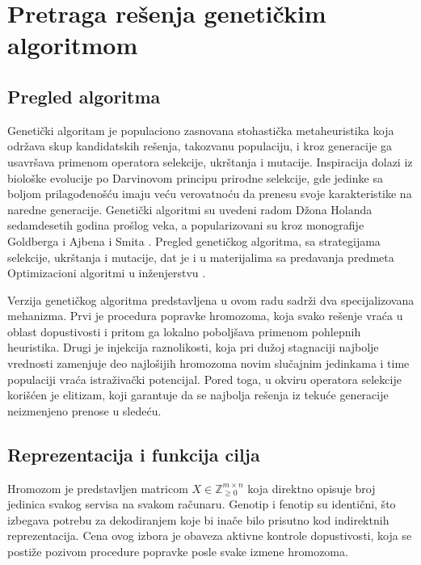 \documentclass[12pt]{article}
\begin{document}
\pagebreak

\section{Pretraga rešenja genetičkim algoritmom}\label{sec:ga}

\subsection{Pregled algoritma}

Genetički algoritam je populaciono zasnovana stohastička metaheuristika koja održava skup kandidatskih rešenja, takozvanu populaciju, i kroz generacije ga usavršava primenom operatora selekcije, ukrštanja i mutacije. Inspiracija dolazi iz biološke evolucije po Darvinovom principu prirodne selekcije, gde jedinke sa boljom prilagođenošću imaju veću verovatnoću da prenesu svoje karakteristike na naredne generacije. Genetički algoritmi su uvedeni radom Džona Holanda \cite{Holland1975} sedamdesetih godina prošlog veka, a popularizovani su kroz monografije Goldberga \cite{Goldberg1989} i Ajbena i Smita \cite{EibenSmith2015}. Pregled genetičkog algoritma, sa strategijama selekcije, ukrštanja i mutacije, dat je i u materijalima sa predavanja predmeta Optimizacioni algoritmi u inženjerstvu \cite{OlcanPetrovicGA}.

Verzija genetičkog algoritma predstavljena u ovom radu sadrži dva specijalizovana mehanizma. Prvi je procedura popravke hromozoma, koja svako rešenje vraća u oblast dopustivosti i pritom ga lokalno poboljšava primenom pohlepnih heuristika. Drugi je injekcija raznolikosti, koja pri dužoj stagnaciji najbolje vrednosti zamenjuje deo najlošijih hromozoma novim slučajnim jedinkama i time populaciji vraća istraživački potencijal. Pored toga, u okviru operatora selekcije korišćen je elitizam, koji garantuje da se najbolja rešenja iz tekuće generacije neizmenjeno prenose u sledeću.

\subsection{Reprezentacija i funkcija cilja}

Hromozom je predstavljen matricom $X \in \mathbb{Z}_{\geq 0}^{m \times n}$ koja direktno opisuje broj jedinica svakog servisa na svakom računaru. Genotip i fenotip su identični, što izbegava potrebu za dekodiranjem koje bi inače bilo prisutno kod indirektnih reprezentacija. Cena ovog izbora je obaveza aktivne kontrole dopustivosti, koja se postiže pozivom procedure popravke posle svake izmene hromozoma.
\end{document}
